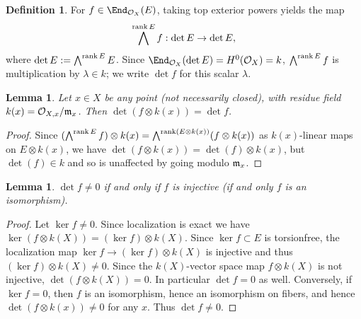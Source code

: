 \documentclass[12pt]{article}
\let\l\lambda
\def\OO{\mathcal O}
\theoremstyle{theorem}
\numberwithin{thm}{section}
\newtheorem{lem}[thm]{Lemma}
\theoremstyle{definition}
\newtheorem{dfn}[thm]{Definition}
\begin{document}


\begin{dfn}
  For $f\in \End_{\OO_X}(E)$, taking top exterior powers yields the map
  $$ \bigwedge^{\operatorname{rank} E} f: \det E  \to \det E, $$
  where $\det E := \bigwedge^{\operatorname{rank} E} E$.
  Since $\End_{\OO_X}(\det E) = H^0(\OO_X)=k$, $\bigwedge^{\operatorname{rank} E} f$ is multiplication by $\l\in k$; we write $\det f$ for this scalar $\l$.
\end{dfn}

\begin{lem}
  Let $x \in X$ be any point (not necessarily closed), with residue field $k(x) = \OO_{X,x}/\m_x$. Then $\det(f\otimes k(x)) =\det f$.
\end{lem}

\begin{proof}
  Since $(\bigwedge^{\operatorname{rank} E} f)\otimes k(x) = \bigwedge^{\operatorname{rank}( E\otimes k(x))}( f\otimes k(x))$ as $k(x)$-linear maps on $E\otimes k(x)$,
  we have $\det(f\otimes k(x)) =\det(f)\otimes k(x)$, but $\det(f)\in k$ and so is unaffected by going modulo $\mathfrak m_x$.
\end{proof}



\begin{lem}
  $\det f \neq 0 $ if and only if $f$ is injective (if and only $f$ is an isomorphism).
\end{lem}

\begin{proof}
  Let $\ker f \neq 0$. Since localization is exact
  we have
  $\ker(f\otimes k(X)) = (\ker f)\otimes k(X)$.
  Since $\ker f \subset E$ is torsionfree, the localization map $\ker f \to (\ker f)\otimes k(X)$ is injective and thus $(\ker f) \otimes k(X)\neq 0$.
  Since the $k(X)$-vector space map $f\otimes k(X)$ is not injective, $\det(f\otimes k(X))= 0$.
  In particular  $\det f = 0$ as well.
  Conversely,
  if $\ker f = 0$, then
  $f$ is an isomorphism, hence an isomorphism on fibers, and hence
  $\det(f\otimes k(x)) \neq 0$ for any $x$. Thus $\det f\neq 0$.
\end{proof}
\end{document}
